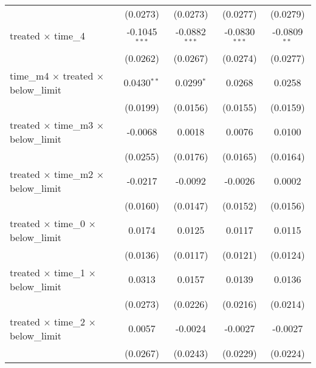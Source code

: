 \begin{tabular}{lcccc}
                                                       & (0.0273)        & (0.0273)              & (0.0277)              & (0.0279)\\   
   treated $\times$ time\_4                            & -0.1045$^{***}$ & -0.0882$^{***}$       & -0.0830$^{***}$       & -0.0809$^{**}$\\   
                                                       & (0.0262)        & (0.0267)              & (0.0274)              & (0.0277)\\   
   time\_m4 $\times$ treated $\times$ below\_limit     & 0.0430$^{**}$   & 0.0299$^{*}$          & 0.0268                & 0.0258\\   
                                                       & (0.0199)        & (0.0156)              & (0.0155)              & (0.0159)\\   
   treated $\times$ time\_m3 $\times$ below\_limit     & -0.0068         & 0.0018                & 0.0076                & 0.0100\\   
                                                       & (0.0255)        & (0.0176)              & (0.0165)              & (0.0164)\\   
   treated $\times$ time\_m2 $\times$ below\_limit     & -0.0217         & -0.0092               & -0.0026               & 0.0002\\   
                                                       & (0.0160)        & (0.0147)              & (0.0152)              & (0.0156)\\   
   treated $\times$ time\_0 $\times$ below\_limit      & 0.0174          & 0.0125                & 0.0117                & 0.0115\\   
                                                       & (0.0136)        & (0.0117)              & (0.0121)              & (0.0124)\\   
   treated $\times$ time\_1 $\times$ below\_limit      & 0.0313          & 0.0157                & 0.0139                & 0.0136\\   
                                                       & (0.0273)        & (0.0226)              & (0.0216)              & (0.0214)\\   
   treated $\times$ time\_2 $\times$ below\_limit      & 0.0057          & -0.0024               & -0.0027               & -0.0027\\   
                                                       & (0.0267)        & (0.0243)              & (0.0229)              & (0.0224)\\   

\end{tabular}
